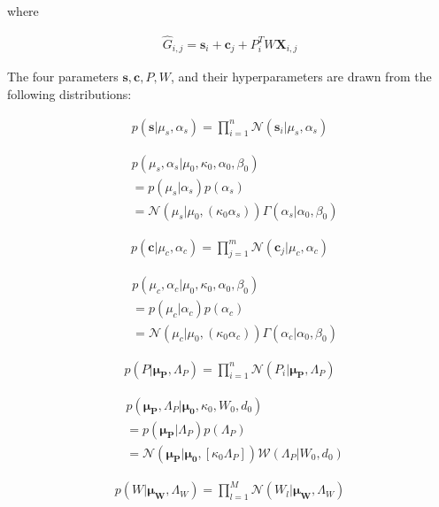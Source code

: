 \documentclass[10pt]{proc}
\begin{document}
where

\begin{align}
    \hat{G}_{i,j} = \bm{s}_i + \bm{c}_j + P_i^TW\bm{X}_{i,j}
\end{align}

The four parameters $\bm{s}, \bm{c}, P, W$, and their hyperparameters are drawn
from the following distributions:

\begin{align}
    p(\bm{s} | \mu_s, \alpha_s) =
        \prod_{i=1}^n \mathcal{N}(\bm{s}_i | \mu_s, \alpha_s)
\end{align}

\begin{align}
    &p(\mu_s, \alpha_s | \mu_0, \kappa_0, \alpha_0, \beta_0) \\
        & = p(\mu_s | \alpha_s) p(\alpha_s) \\
        & = \mathcal{N}(\mu_s | \mu_0, (\kappa_0 \alpha_s))
            \Gamma(\alpha_s | \alpha_0, \beta_0)
\end{align}

\begin{align}
    p(\bm{c} | \mu_c, \alpha_c) =
        \prod_{j=1}^m \mathcal{N}(\bm{c}_j | \mu_c, \alpha_c)
\end{align}

\begin{align}
    &p(\mu_c, \alpha_c | \mu_0, \kappa_0, \alpha_0, \beta_0) \\
        & = p(\mu_c | \alpha_c) p (\alpha_c) \\
        & = \mathcal{N}(\mu_c | \mu_0, (\kappa_0 \alpha_c))
            \Gamma(\alpha_c | \alpha_0, \beta_0)
\end{align}

\begin{align}
    p(P | \bm{\mu_P}, \Lambda_P) =
        \prod_{i=1}^n \mathcal{N}(P_i | \bm{\mu_P}, \Lambda_P)
\end{align}

\begin{align}
    &p(\bm{\mu_P}, \Lambda_P | \bm{\mu_0}, \kappa_0, W_0, d_0) \\
        & = p(\bm{\mu_P} | \Lambda_P) p(\Lambda_P) \\
        & = \mathcal{N}(\bm{\mu_P} | \bm{\mu_0}, [\kappa_0 \Lambda_P])
            \mathcal{W}(\Lambda_P | W_0, d_0)
\end{align}

\begin{align}
    p(W | \bm{\mu_W}, \Lambda_W) =
        \prod_{l=1}^M \mathcal{N}(W_l | \bm{\mu_W}, \Lambda_W)
\end{align}
\end{document}
